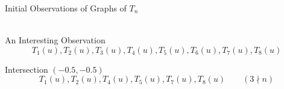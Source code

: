 \documentclass{beamer}
\begin{document}
\begin{frame}{Initial Observations of Graphs of $T_n$}
  \\
  \\
\end{frame}

\begin{frame}{An Interesting Observation}
 \vspace{-12pt}
 \[T_1(u), T_2(u), T_3(u), T_4(u), T_5(u), T_6(u), T_7(u), T_8(u)\]
\end{frame}

\begin{frame}{Intersection $(-0.5,-0.5)$}
 \vspace{-12pt}
 \[T_1(u), T_2(u), T_4(u), T_5(u), T_7(u), T_8(u)\qquad (3\nmid n)\]
\end{frame}
\end{document}
